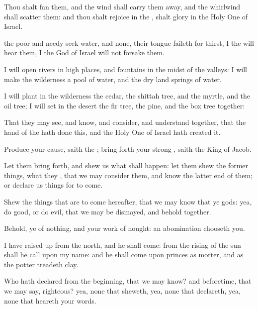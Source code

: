 {Thou shalt
fan them, and the
wind shall carry them
away, and the
whirlwind shall
scatter them: and thou shalt
rejoice in the
{},
{} shalt
glory in the Holy
One of
Israel.

 the
poor and
needy
seek
water, and
{} none,
{} their
tongue
faileth for
thirst, I the
{} will
hear them, I the
God of
Israel will not
forsake them.

I will
open
rivers in high
places, and
fountains in the
midst of the
valleys: I will
make the
wilderness a
pool of
water, and the
dry
land
springs of
water.

I will
plant in the
wilderness the
cedar, the shittah
tree, and the
myrtle, and the
oil
tree; I will
set in the
desert the fir
tree,
{} the
pine, and the box
tree
together:

That they may
see, and
know, and
consider, and
understand
together, that the
hand of the
{} hath
done this, and the Holy
One of
Israel hath
created it.


\par }{\PP {}Produce your
cause,
saith the
{}; bring
forth your
strong
{},
saith the
King of
Jacob.

Let them bring
{}
forth, and
shew us what shall
happen: let them
shew the former
things, what they
{}, that we may
consider them, and
know the latter
end of them; or
declare us things for to
come.

Shew the things that are to
come
hereafter, that we may
know that ye
{}
gods: yea, do
good, or do
evil, that we may be
dismayed, and
behold
{}
together.

Behold, ye
{} of
nothing, and your
work of
nought: an
abomination
{}
chooseth you.

I have raised
up
{} from the
north, and he shall
come: from the
rising of the
sun shall he
call upon my
name: and he shall
come upon
princes as
{}
morter, and as the
potter
treadeth
clay.

Who hath
declared from the
beginning, that we may
know? and
beforetime, that we may
say,
{}
righteous? yea,
{} none that
sheweth, yea,
{} none that
declareth, yea,
{} none that
heareth your
words.

}
